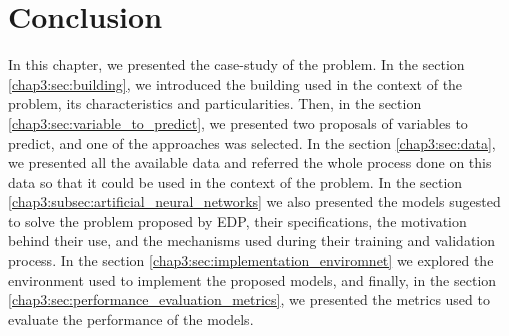 \section{Conclusion}\label{chap3:sec:conclusion}

In this chapter, we presented the case-study of the problem. In the section \ref{chap3:sec:building}, we introduced the building used in the context of the problem, its characteristics and particularities. Then, in the section \ref{chap3:sec:variable_to_predict}, we presented two proposals of variables to predict, and one of the approaches was selected. In the section \ref{chap3:sec:data}, we presented all the available data and referred the whole process done on this data so that it could be used in the context of the problem.  In the section \ref{chap3:subsec:artificial_neural_networks} we also presented the models sugested to solve the problem proposed by \ac{EDP}, their specifications, the motivation behind their use, and the mechanisms used during their training and validation process. In the section \ref{chap3:sec:implementation_enviromnet} we explored the environment used to implement the proposed models, and finally, in the section \ref{chap3:sec:performance_evaluation_metrics}, we presented the metrics used to evaluate the performance of the models.